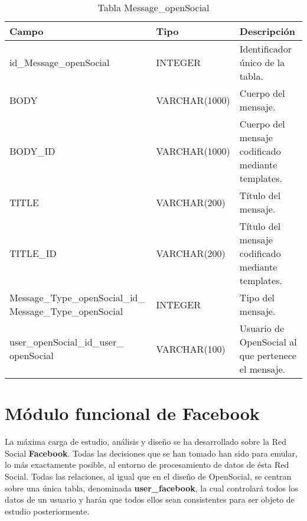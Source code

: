 \begin{table}[h]
\begin{center}
\begin{tabular}{| p{65mm}  | l | p{60mm} |}\hline
\textbf{Campo}&\textbf{Tipo}&\textbf{Descripción} \\ \hline
id\_Message\_openSocial & INTEGER & Identificador único de la tabla. \\ \hline
BODY & VARCHAR(1000) & Cuerpo del mensaje. \\ \hline
BODY\_ID & VARCHAR(1000) & Cuerpo del mensaje codificado mediante templates. \\ \hline
TITLE & VARCHAR(200) & Título del mensaje. \\ \hline
TITLE\_ID & VARCHAR(200) & Título del mensaje codificado mediante templates. \\ \hline
Message\_Type\_openSocial\_id\_ Message\_Type\_openSocial & INTEGER & Tipo del mensaje. \\ \hline
user\_openSocial\_id\_user\_ openSocial & VARCHAR(100) & Usuario de OpenSocial al que pertenece el mensaje. \\ \hline
\end{tabular}
\end{center}
\caption{Tabla Message\_openSocial} \label{tabMessageOpenSocial}
\end{table}

\bigskip
\par
\section{Módulo funcional de Facebook}
La máxima carga de estudio, análisis y diseño se ha desarrollado sobre la Red Social \textbf{Facebook}. Todas las decisiones que se han tomado han sido para emular, lo más exactamente posible, al entorno de procesamiento de datos de ésta Red Social. Todas las relaciones, al igual que en el diseño de OpenSocial, se centran sobre una única tabla, denominada \textbf{user\_facebook}, la cual controlará todos los datos de un usuario y harán que todos ellos sean consistentes para ser objeto de estudio posteriormente.

